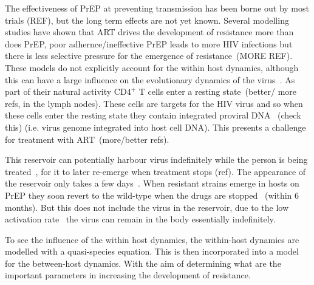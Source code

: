 \documentclass[DIV=15]{scrartcl}
\begin{document}
 The effectiveness of PrEP at preventing transmission has been borne out by most trials  (REF), but the long term effects are not yet known. Several  modelling studies have shown that  ART drives the development of resistance more than does PrEP, poor adhernce/ineffective PrEP leads to more HIV infections but there is less  selective pressure for the emergence of  resistance~\cite{abbas2013}(MORE REF). These models do not explicitly account for the within host dynamics, although this can have a large influence on the evolutionary dynamics of the virus~\cite{lythgoe2013}.    As part of their natural activity CD$4^+$ T  cells enter a resting state~\cite{bukrinsky1991}(better/ more refs, in the lymph nodes). These cells are targets for the HIV virus and so when these cells enter the resting state they contain integrated  proviral  DNA~ \cite{chun1997,finzi1997}(check this) (i.e. virus genome integrated into host cell DNA).  This presents a challenge for treatment with ART~\cite{chun2015}(more/better refs). 


This reservoir can potentially harbour virus indefinitely while the person is being treated~\cite{siliciano2003,crooks2015}, for  it to later re-emerge when treatment stops (ref). The appearance of the reservoir   only takes a few days~\cite{sompayrac2011}. 
When resistant strains emerge in hosts on PrEP they soon revert to the wild-type  when the drugs are stopped~\cite{weis2016} (within 6 months). But this  does not include the virus in the reservoir, due to the  low activation rate~\cite{finzi1999} the virus can remain in the body essentially indefinitely.










To see the influence of  the within host dynamics, the within-host dynamics are modelled with a quasi-species equation. This is then incorporated into a model for the between-host dynamics. With the aim of determining what are the important parameters in increasing the development of resistance.
\end{document}
